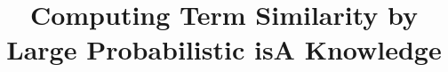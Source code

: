 \documentclass{sig-alternate-2013}%
\begin{document}
\title{Computing Term Similarity by Large Probabilistic isA Knowledge}
%
\end{document}
